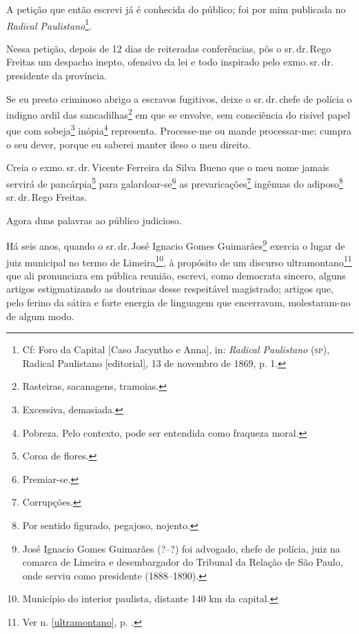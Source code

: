 A petição que então escrevi já é conhecida do público; foi por mim
publicada no \emph{Radical Paulistano}\footnote{Cf: Foro da Capital
  {[}Caso Jacyntho e Anna{]}, in: \emph{Radical Paulistano} (\textsc{sp}),
  Radical Paulistano {[}editorial{]}, 13 de novembro de 1869, p. 1.}.

Nessa petição, depois de 12 dias de reiteradas conferências, pôs o sr.\,dr.\,Rego Freitas um despacho inepto, ofensivo da lei e todo inspirado
pelo exmo.\,sr.\,dr.\,presidente da província.

Se eu presto criminoso abrigo a escravos fugitivos, deixe o sr.\,dr.\,chefe de polícia o indigno ardil das sancadilhas\footnote{Rasteiras,
  sacanagens, tramoias.} em que se envolve, sem consciência do risível
papel que com sobeja\footnote{Excessiva, demasiada.} inópia\footnote{
  Pobreza. Pelo contexto, pode ser entendida como fraqueza moral.}
representa. Processe-me ou mande processar-me; cumpra o seu dever,
porque eu saberei manter ileso o meu direito.

Creia o exmo.\,sr.\,dr.\,Vicente Ferreira da Silva Bueno que o meu nome
jamais servirá de pancárpia\footnote{Coroa de flores.} para
galardoar-se\footnote{Premiar-se.} as prevaricações\footnote{
  Corrupções.} ingênuas do adiposo\footnote{Por sentido figurado,
  pegajoso, nojento.} sr.\,dr.\,Rego Freitas.

Agora duas palavras ao público judicioso.

Há seis anos, quando o sr.\,dr.\,José Ignacio Gomes Guimarães\footnote{
  José Ignacio Gomes Guimarães (?--?) foi advogado, chefe de polícia,
  juiz na comarca de Limeira e desembargador do Tribunal da Relação de
  São Paulo, onde serviu como presidente (1888--1890).} exercia o lugar
de juiz municipal no termo de Limeira\footnote{Município do interior
  paulista, distante 140 km da capital.}, à propósito de um discurso
ultramontano\footnote{Ver n. \ref{ultramontano}, p. 
\pageref{ultramontano}.} que ali
pronunciara em pública reunião, escrevi, como democrata sincero, alguns
artigos estigmatizando as doutrinas desse respeitável magistrado;
artigos que, pelo ferino da sátira e forte energia de linguagem que
encerravam, molestaram-no de algum modo.


